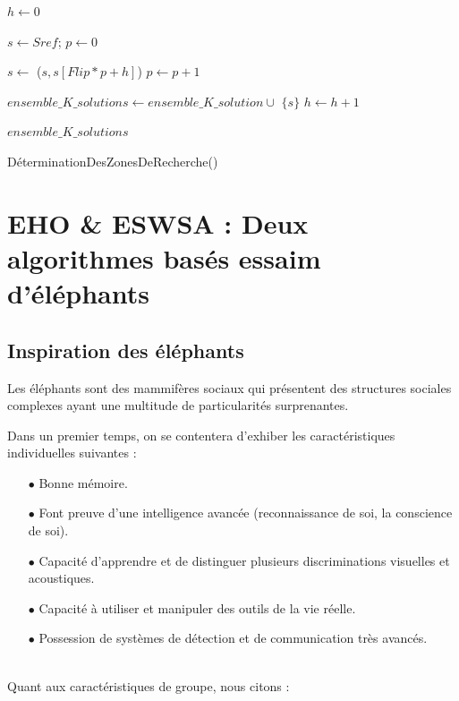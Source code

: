 \begin{function}[H]
	\vspace{-0.2cm}		
	\xdash[13.5cm]
	
	\SetAlgoLined
	\DontPrintSemicolon
	$h \gets 0$\;
	
	
	
	{ $s \gets Sref$; 	$p \gets 0$\;
		{
			
			$s \gets$ \Inverser($s,s[Flip*p+h]$)\;
			$p \gets p + 1$\;
			
		}
		$ensemble\_K\_solutions \gets ensemble\_K\_solution\cup$ $\{s\}$\;
		$h \gets h + 1$\;
	}
	
	\Return $ensemble\_K\_solutions$\;
	
	\caption{DéterminationDesZonesDeRecherche()}
	
\end{function}







\section{EHO \& ESWSA : Deux algorithmes basés essaim d'éléphants}
\subsection{Inspiration des éléphants}
Les éléphants sont des mammifères sociaux qui présentent des structures sociales complexes ayant une multitude de particularités surprenantes.


Dans un premier temps, on se contentera d'exhiber les caractéristiques individuelles suivantes \cite{EHO1} :


\begin{itemize}
	
	\item[$\bullet$] Bonne mémoire.
	\item[$\bullet$] Font preuve d'une intelligence avancée (reconnaissance de soi, la conscience de soi).
	\item[$\bullet$] Capacité d'apprendre et de distinguer plusieurs discriminations visuelles et acoustiques.
	\item[$\bullet$] Capacité à utiliser et manipuler des outils de la vie réelle.
	\item[$\bullet$] Possession de systèmes de détection et de communication très avancés.
\end{itemize}
\textbf{ }\\
\textbf{ }
Quant aux caractéristiques de groupe, nous citons \cite{EHO2} :


